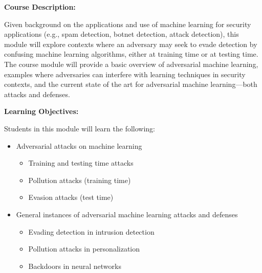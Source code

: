\documentclass[12pt]{article}
\renewcommand{\_}{\kern-1.5pt\textunderscore\kern-1.5pt}
\begin{document}

\textbf{Course Description:}\par

Given background on the applications and use of machine learning for security applications (e.g., spam detection, botnet detection, attack detection), this module will explore contexts where an adversary may seek to evade detection by confusing machine learning algorithms, either at training time or at testing time. The course module will provide a basic overview of adversarial machine learning, examples where adversaries can interfere with learning techniques in security contexts, and the current state of the art for adversarial machine learning—both attacks and defenses.\par


\textbf{Learning Objectives:}\par

Students in this module will learn the following:\par

\begin{itemize}
	\item Adversarial attacks on machine learning\par

\begin{itemize}
	\item Training and testing time attacks\par

	\item Pollution attacks (training time)\par

	\item Evasion attacks (test time)\par


\end{itemize}
	\item General instances of adversarial machine learning attacks and defenses\par

\begin{itemize}
	\item Evading detection in intrusion detection\par

	\item Pollution attacks in personalization\par

	\item Backdoors in neural networks
\end{itemize}
\end{itemize}\par
\end{document}
